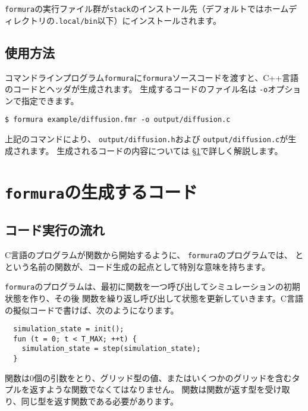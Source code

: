 \documentclass{jsarticle}
\newcommand{\formura}{{\texttt{formura}}}
\begin{document}
\formura の実行ファイル群が\verb`stack`のインストール先（デフォルトではホームディレクトリの\verb+.local/bin+以下）にインストールされます。


\subsection{使用方法}

コマンドラインプログラム\formura に\formura ソースコードを渡すと、C++言語のコードとヘッダが生成されます。
生成するコードのファイル名は
\verb`-o`オプションで指定できます。

\begin{verbatim}
$ formura example/diffusion.fmr -o output/diffusion.c
\end{verbatim}

上記のコマンドにより、
\verb`output/diffusion.h`および
\verb`output/diffusion.c`が生成されます。
生成されるコードの内容については
\S \ref{sec:formura-generated-code}で詳しく解説します。


\newpage

\section{\formura の生成するコード}\label{sec:formura-generated-code}

\subsection{コード実行の流れ}

C言語のプログラムが関数から開始するように、
\formura のプログラムでは、
と
という名前の関数が、コード生成の起点として特別な意味を持ちます。

\formura のプログラムは、最初に関数を一つ呼び出してシミュレーションの初期状態を作り、その後
関数を繰り返し呼び出して状態を更新していきます。C言語の擬似コードで書けば、次のようになります。

\begin{screen}
\begin{verbatim}
  simulation_state = init();
  fun (t = 0; t < T_MAX; ++t) {
    simulation_state = step(simulation_state);
  }
\end{verbatim}
\end{screen}


関数は0個の引数をとり、グリッド型の値、またはいくつかのグリッドを含むタプルを返すような関数でなくてはなりません。
関数は関数が返す型を受け取り、同じ型を返す関数である必要があります。
\end{document}
